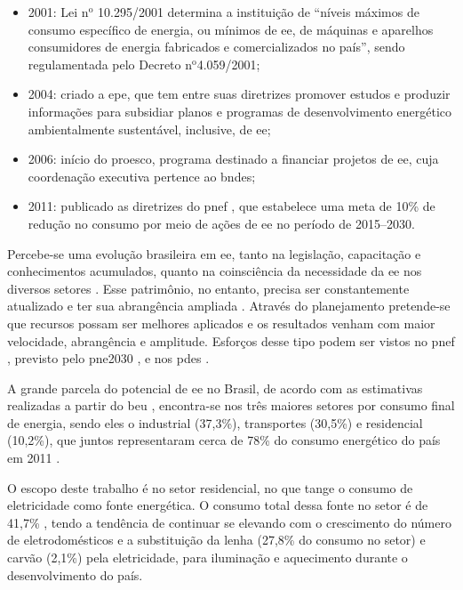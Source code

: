 \begin{itemize}
Foi realizado um investimento total em \glspl{pee} 
pelas concessionárias do setor elétrico na quantia de $\text{R\$}$ 2 bilhões até
o ano de 2006, onde se estima que o programa alcançou uma econômia média de 
4.000 GWh/ano e retirando uma carga de ponta de consumo na ordem de 1.140 MW no período de 1998--2005;
\item 2001: Lei n$^\text{o}$ 10.295/2001 determina a instituição de ``níveis
máximos de consumo específico de energia, ou mínimos de \gls{ee},
de máquinas e aparelhos consumidores de energia fabricados e comercializados no
país'', sendo regulamentada pelo Decreto n$^\text{o}$4.059/2001;
\item 2004: criado a \gls{epe}, que tem entre suas diretrizes promover estudos e
produzir informações para subsidiar planos e programas de desenvolvimento
energético ambientalmente sustentável, inclusive, de \gls{ee};
\item 2006: início do \gls{proesco}, programa destinado a financiar projetos de
\gls{ee}, cuja coordenação executiva pertence ao \gls{bndes};
\item 2011: publicado as diretrizes do \gls{pnef} \cite{pnef}, que estabelece uma meta de
10\% de redução no consumo por meio de ações de \gls{ee} no período 
de 2015--2030.
\end{itemize}

Percebe-se uma evolução brasileira em \gls{ee}, tanto na legislação, 
capacitação e conhecimentos acumulados, quanto na 
coinsciência da necessidade da \gls{ee} nos diversos setores \cite{pnef}. 
Esse patrimônio, no entanto, precisa ser constantemente atualizado 
e ter sua abrangência ampliada \cite{pne30_eff_energ}. Através do planejamento pretende-se que
recursos possam ser melhores aplicados e os resultados venham com maior
velocidade, abrangência e amplitude. Esforços desse tipo podem ser vistos no
\gls{pnef} \cite{pnef}, previsto pelo \gls{pne2030} \cite{pne30_eff_energ}, e nos
\glspl{pde} \cite{pde_2020}.

A grande parcela do potencial de \gls{ee} no Brasil, de acordo com as
estimativas realizadas a partir do \gls{beu} \cite{beu}, encontra-se nos três
maiores setores por consumo final de energia, sendo eles o industrial (37,3\%), 
transportes (30,5\%) e residencial (10,2\%), que juntos representaram cerca 
de 78\% do consumo energético do país em 2011 \cite{ben2012,epe_eficiencia_2012}.

O escopo deste trabalho é no setor residencial, no que tange o consumo de eletricidade como
fonte energética. O consumo total dessa fonte no setor é de 41,7\% \cite{ben2012}, 
tendo a tendência de continuar se elevando com o crescimento do número de eletrodomésticos 
e a substituição da lenha (27,8\% do consumo no setor) e carvão (2,1\%) pela eletricidade, 
para iluminação e aquecimento durante o desenvolvimento do país. 

